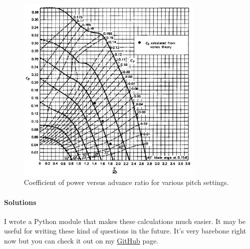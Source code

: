 \documentclass{article}
\begin{document}
\begin{figure}[H]
    \centering
    \includegraphics[width=0.8\textwidth]{cp.jpg}
    \caption{Coefficient of power versus advance ratio for various pitch settings.}
    \label{fig:cp}
\end{figure}


\paragraph{Solutions}
I wrote a Python module that makes these calculations much easier. It may be useful for writing these kind of questions in the future. It's very barebone right now but you can check it out on my \href{https://github.com/darentang/pyturb}{GitHub} page.
\end{document}
